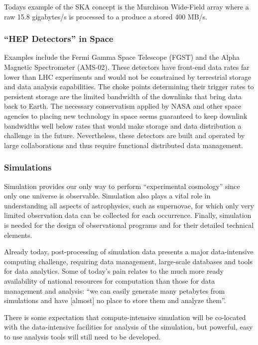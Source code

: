 Todays example of the SKA concept is the Murchison Wide-Field array where a raw 
15.8 gigabytes/s is processed to a produce a stored 400 MB/s.

\subsubsection{“HEP Detectors” in Space}
Examples include the Fermi Gamma Space Telescope (FGST) and the Alpha Magnetic 
Spectrometer (AMS-02).  These detectors have front-end data rates far lower than 
LHC experiments and would not be constrained by terrestrial storage and data analysis 
capabilities.  The choke points determining their trigger rates to persistent storage 
are the limited bandwidth of the downlinks that bring data back to Earth.  The 
necessary conservatism applied by NASA and other space agencies to placing new 
technology in space seems guaranteed to keep downlink bandwidths well below rates 
that would make storage and data distribution a challenge in the future.  
Nevertheless, these detectors are built and operated by large collaborations and 
thus require functional distributed data management.

\subsubsection{Simulations}
Simulation provides our only way to perform ``experimental cosmology'' since only one 
universe is observable.  Simulation also plays a vital role in understanding all 
aspects of astrophysics, such as supernovae, for which only very limited observation 
data can be collected for each occurrence. Finally, simulation is needed for the 
design of observational programs and for their detailed technical elements.

Already today, post-processing of simulation data presents a major data-intensive 
computing challenge, requiring data management, large-scale databases and tools for 
data analytics.  Some of today’s pain relates to the much more ready availability of 
national resources for computation than those for data management and analysis: ``we 
can easily generate many petabytes from simulations and have [almost] no place to 
store them and analyze them''.

There is some expectation that compute-intensive simulation will be co-located with the 
data-intensive facilities for analysis of the simulation, but powerful, easy to use 
analysis tools will still need to be developed.

